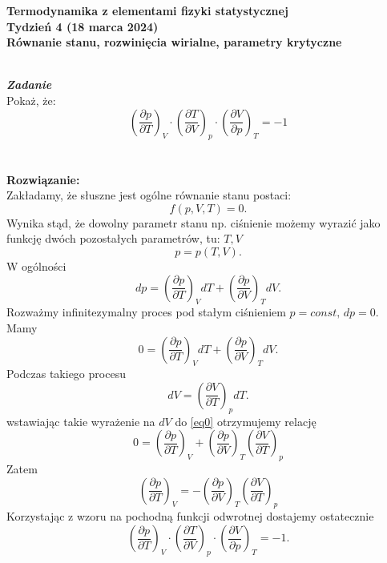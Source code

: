 \documentclass[11pt,a4paper]{article}
\newcounter{zadanie}\newcommand{\zadanie}[1][]{\addtocounter{zadanie}{1} ~\\  {\bf \emph{Zadanie \arabic{zadanie} #1 }} \\}
\newcommand{\Partial}[3]{\left( \frac{\partial #1}{\partial #2} \right)_{#3}}
\begin{document}

\begin{centering}
\bf{\Large{Termodynamika z elementami fizyki statystycznej}}\\
Tydzień 4  (18 marca 2024)\\[3mm]
Równanie stanu, rozwinięcia wirialne, parametry krytyczne \\ 
\end{centering} 
\vspace{5mm}

\zadanie
Pokaż, że: \[ 
\left(\frac{\partial p}{\partial T}\right)_V \cdot
\left(\frac{\partial T}{\partial V}\right)_p \cdot
\left(\frac{\partial V}{\partial p}\right)_T = -1 
\]
\\
\\
\textbf{Rozwiązanie:}
\\
Zakładamy, że słuszne jest ogólne równanie stanu postaci:
\begin{equation*}
    f(p,V,T)=0.
\end{equation*}
Wynika stąd, że dowolny parametr stanu np. ciśnienie możemy wyrazić jako funkcję dwóch pozostałych parametrów, tu: $T,V$
\begin{equation*}
    p=p(T,V).
\end{equation*}
W ogólności
\begin{equation*}
    dp = \Partial{p}{T}{V}dT+\Partial{p}{V}{T}dV.
\end{equation*}
Rozważmy infinitezymalny proces pod stałym ciśnieniem $p=const, \, dp=0$. Mamy
\begin{equation}
\label{eq0}
    0=\Partial{p}{T}{V}dT+\Partial{p}{V}{T}dV.
\end{equation}
Podczas takiego procesu
\begin{equation*}
    dV=\Partial{V}{T}{p}dT.
\end{equation*}
wstawiając takie wyrażenie na $dV$ do \eqref{eq0} otrzymujemy relację
\begin{equation*}
    0=\Partial{p}{T}{V}+\Partial{p}{V}{T}\Partial{V}{T}{p}
\end{equation*}
Zatem
\begin{equation*}
    \Partial{p}{T}{V}=-\Partial{p}{V}{T}\Partial{V}{T}{p}
\end{equation*}
Korzystając z wzoru na pochodną funkcji odwrotnej dostajemy ostatecznie
\[ 
\left(\frac{\partial p}{\partial T}\right)_V \cdot
\left(\frac{\partial T}{\partial V}\right)_p \cdot
\left(\frac{\partial V}{\partial p}\right)_T = -1.
\]
\end{document}
